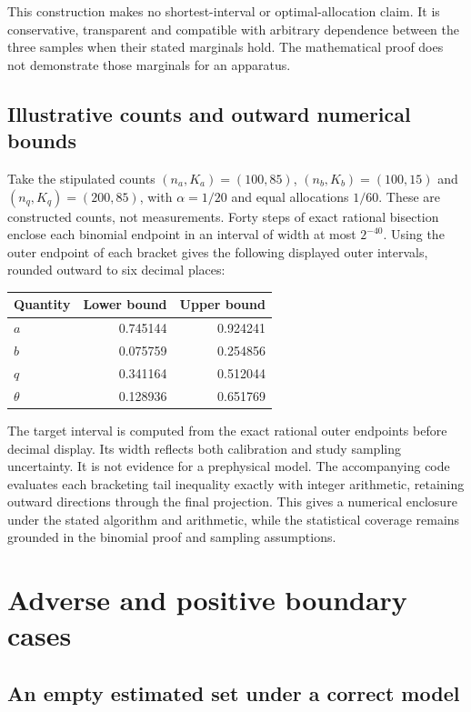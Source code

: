 \documentclass[11pt]{article}
\begin{document}
This construction makes no shortest-interval or optimal-allocation claim. It is conservative, transparent and compatible with arbitrary dependence between the three samples when their stated marginals hold. The mathematical proof does not demonstrate those marginals for an apparatus.

\subsection{Illustrative counts and outward numerical bounds}

Take the stipulated counts $(n_a,K_a)=(100,85)$, $(n_b,K_b)=(100,15)$ and $(n_q,K_q)=(200,85)$, with $\alpha=1/20$ and equal allocations $1/60$. These are constructed counts, not measurements. Forty steps of exact rational bisection enclose each binomial endpoint in an interval of width at most $2^{-40}$. Using the outer endpoint of each bracket gives the following displayed outer intervals, rounded outward to six decimal places:
\begin{center}
\begin{tabular}{lrr}
\toprule
Quantity & Lower bound & Upper bound\\
\midrule
$a$ & 0.745144 & 0.924241\\
$b$ & 0.075759 & 0.254856\\
$q$ & 0.341164 & 0.512044\\
$\theta$ & 0.128936 & 0.651769\\
\bottomrule
\end{tabular}
\end{center}
The target interval is computed from the exact rational outer endpoints before decimal display. Its width reflects both calibration and study sampling uncertainty. It is not evidence for a prephysical model. The accompanying code evaluates each bracketing tail inequality exactly with integer arithmetic, retaining outward directions through the final projection. This gives a numerical enclosure under the stated algorithm and arithmetic, while the statistical coverage remains grounded in the binomial proof and sampling assumptions.

\section{Adverse and positive boundary cases}

\subsection{An empty estimated set under a correct model}
\end{document}
